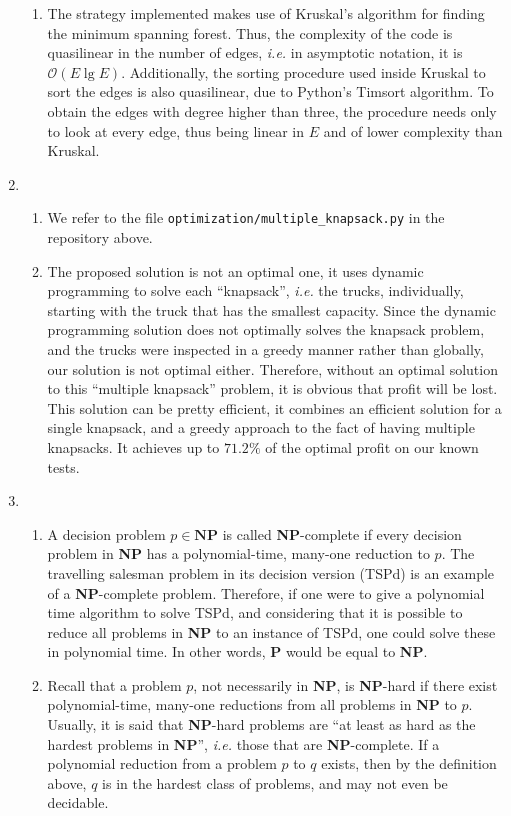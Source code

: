 \documentclass[12pt]{article}
\begin{document}
\begin{enumerate}
\begin{enumerate}
    \item The strategy implemented makes use of Kruskal's algorithm for finding the minimum spanning forest. Thus, the complexity of the code is quasilinear in the number of edges, \emph{i.e.} in asymptotic notation, it is $\mathcal{O}(E \lg E)$. Additionally, the sorting procedure used inside Kruskal to sort the edges is also quasilinear, due to Python's Timsort algorithm. To obtain the edges with degree higher than three, the procedure needs only to look at every edge, thus being linear in $E$ and of lower complexity than Kruskal.
  \end{enumerate}
  \item
  \begin{enumerate}
    \item We refer to the file \texttt{optimization/multiple\_knapsack.py} in the repository above.
    \item The proposed solution is not an optimal one, it uses dynamic programming to solve each ``knapsack'', \textit{i.e.} the trucks, individually, starting with the truck that has the smallest capacity. Since the dynamic programming solution does not optimally solves the knapsack problem, and the trucks were inspected in a greedy manner rather than globally, our solution is not optimal either. Therefore, without an optimal solution to this ``multiple knapsack'' problem, it is obvious that profit will be lost. This solution can be pretty efficient, it combines an efficient solution for a single knapsack, and a greedy approach to the fact of having multiple knapsacks. It achieves up to $71.2\%$ of the optimal profit on our known tests.
  \end{enumerate}
  \item 
  \begin{enumerate}
    \item A decision problem $p \in \mathbf{NP}$ is called \textbf{NP}-complete if every decision problem in \textbf{NP} has a polynomial-time, many-one reduction to $p$. The travelling salesman problem in its decision version (TSPd) is an example of a \textbf{NP}-complete problem. Therefore, if one were to give a polynomial time algorithm to solve TSPd, and considering that it is possible to reduce all problems in \textbf{NP} to an instance of TSPd, one could solve these in polynomial time. In other words, \textbf{P} would be equal to \textbf{NP}.
    \item Recall that a problem $p$, not necessarily in \textbf{NP}, is \textbf{NP}-hard if there exist polynomial-time, many-one reductions from all problems in \textbf{NP} to $p$. Usually, it is said that \textbf{NP}-hard problems are ``at least as hard as the hardest problems in \textbf{NP}'', \emph{i.e.} those that are \textbf{NP}-complete. If a polynomial reduction from a problem $p$ to $q  $ exists, then by the definition above, $q$ is in the hardest class of problems, and may not even be decidable.

\end{enumerate}
\end{enumerate}
\end{document}
